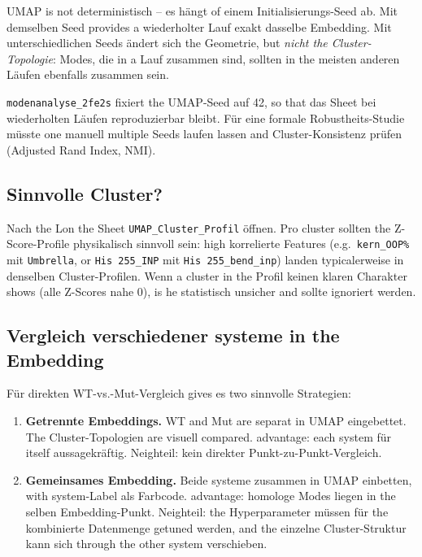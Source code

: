 \documentclass[11pt,a4paper,twoside]{article}
\theoremstyle{remark}
\begin{document}
UMAP is not deterministisch -- es h\"angt of einem
Initialisierungs-Seed ab. Mit demselben Seed provides a wiederholter
Lauf exakt dasselbe Embedding. Mit unterschiedlichen Seeds \"andert
sich the Geometrie, but \emph{nicht the Cluster-Topologie}: Modes,
die in a Lauf zusammen sind, sollten in the meisten anderen
L\"aufen ebenfalls zusammen sein.

\texttt{modenanalyse\_2fe2s} fixiert the UMAP-Seed auf 42, so that das
Sheet bei wiederholten L\"aufen reproduzierbar bleibt. F\"ur eine
formale Robustheits-Studie m\"usste one manuell multiple Seeds laufen
lassen and Cluster-Konsistenz pr\"ufen (Adjusted Rand Index, NMI).

\subsection{Sinnvolle Cluster?}

Nach the Lon the Sheet \texttt{UMAP\_Cluster\_Profil} \"offnen.
Pro cluster sollten the Z-Score-Profile physikalisch sinnvoll sein:
high korrelierte Features (e.g.\ \texttt{kern\_OOP\%} mit
\texttt{Umbrella}, or \texttt{His 255\_INP} mit
\texttt{His 255\_bend\_inp}) landen typicalerweise in denselben
Cluster-Profilen. Wenn a cluster in the Profil keinen klaren
Charakter shows (alle Z-Scores nahe 0), is he statistisch
unsicher and sollte ignoriert werden.

\subsection{Vergleich verschiedener systeme in the Embedding}

F\"ur direkten WT-vs.-Mut-Vergleich gives es two sinnvolle
Strategien:

\begin{enumerate}
  \item \textbf{Getrennte Embeddings.} WT and Mut are separat in
        UMAP eingebettet. The Cluster-Topologien are visuell
        compared. advantage: each system f\"ur itself aussagekr\"aftig.
        Neighteil: kein direkter Punkt-zu-Punkt-Vergleich.
  \item \textbf{Gemeinsames Embedding.} Beide systeme zusammen in
        UMAP einbetten, with system-Label als Farbcode. advantage:
        homologe Modes liegen in the selben Embedding-Punkt. Neighteil:
        the Hyperparameter m\"ussen f\"ur the kombinierte Datenmenge
        getuned werden, and the einzelne Cluster-Struktur kann sich
        through the other system verschieben.
\end{enumerate}
\end{document}
